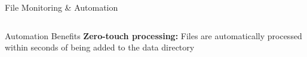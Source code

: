 \documentclass[aspectratio=169]{beamer}
\begin{document}
\begin{frame}{File Monitoring \& Automation}
\begin{columns}[c]
\begin{column}{0.5\textwidth}
\begin{center}
            \end{center}
        \end{column}
    \end{columns}
    
    \vspace{0.3cm}
    
    \begin{alertblock}{Automation Benefits}
        \textbf{Zero-touch processing:} Files are automatically processed within seconds of being added to the data directory
    \end{alertblock}
\end{frame}
\end{document}
